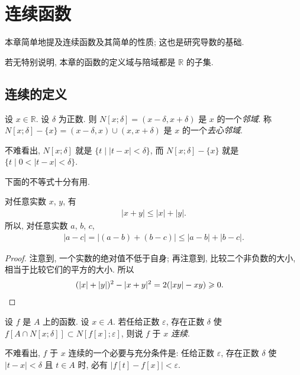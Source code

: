 \chapter{连续函数}

本章简单地提及连续函数及其简单的性质; 这也是研究导数的基础.

若无特别说明, 本章的函数的定义域与陪域都是 $\mathbb{R}$ 的子集.

\section{连续的定义}

\begin{definition}
    设 $x \in \mathbb{R}$. 设 $\delta$ 为正数. 则 $N[x; \delta] = (x - \delta, x + \delta)$ 是 $x$ 的一个\emph{邻域}. 称 $N[x; \delta] - \{ x \} = (x - \delta, x) \cup (x, x + \delta)$ 是 $x$ 的一个\emph{去心邻域}.
\end{definition}

不难看出, $N[x; \delta]$ 就是 $\{ t \mid |t - x| < \delta \}$, 而 $N[x; \delta] - \{ x \}$ 就是 $\{ t \mid 0 < |t - x| < \delta \}$.

下面的不等式十分有用.

\begin{theorem}
    对任意实数 $x$, $y$, 有
    \begin{align*}
        |x + y| \leq |x| + |y|.
    \end{align*}
    所以, 对任意实数 $a$, $b$, $c$,
    \begin{align*}
        |a - c| = |(a - b) + (b - c)| \leq |a - b| + |b - c|.
    \end{align*}
\end{theorem}

\begin{proof}
    注意到, 一个实数的绝对值不低于自身; 再注意到, 比较二个非负数的大小, 相当于比较它们的平方的大小. 所以
    \begin{align*}
         & {(|x| + |y|)^2 - |x + y|^2 = 2(|xy| - xy) \geq 0.} \qedhere
    \end{align*}
\end{proof}

\begin{definition}
    设 $f$ 是 $A$ 上的函数. 设 $x \in A$. 若任给正数 $\varepsilon$, 存在正数 $\delta$ 使 $f[A \cap N[x; \delta]] \subset N[f[x]; \varepsilon]$, 则说 $f$ 于 $x$ \emph{连续}.
\end{definition}

不难看出, $f$ 于 $x$ 连续的一个必要与充分条件是: 任给正数 $\varepsilon$, 存在正数 $\delta$ 使 $|t - x| < \delta$ 且 $t \in A$ 时, 必有 $|f[t] - f[x]| < \varepsilon$.

